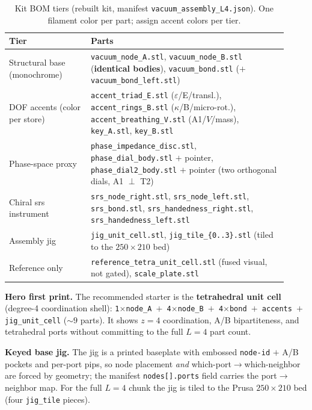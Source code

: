 \begin{table}[htbp]
\centering
\caption{Kit BOM tiers (rebuilt kit, manifest \texttt{vacuum\_assembly\_L4.json}). One filament color per part; assign accent colors per tier.}
\label{tab:vol9_exp_print_bom}
\begin{tabular}{p{0.27\linewidth} p{0.65\linewidth}}
\toprule
\textbf{Tier} & \textbf{Parts} \\
\midrule
Structural base (monochrome) & \texttt{vacuum\_node\_A.stl}, \texttt{vacuum\_node\_B.stl} (\textbf{identical bodies}), \texttt{vacuum\_bond.stl} ($+$ \texttt{vacuum\_bond\_left.stl}) \\
DOF accents (color per store) & \texttt{accent\_triad\_E.stl} ($\varepsilon$/E/transl.), \texttt{accent\_rings\_B.stl} ($\kappa$/B/micro-rot.), \texttt{accent\_breathing\_V.stl} (A1/$V$/mass), \texttt{key\_A.stl}, \texttt{key\_B.stl} \\
Phase-space proxy & \texttt{phase\_impedance\_disc.stl}, \texttt{phase\_dial\_body.stl} $+$ pointer, \texttt{phase\_dial2\_body.stl} $+$ pointer (two orthogonal dials, A1 $\perp$ T2) \\
Chiral srs instrument & \texttt{srs\_node\_right.stl}, \texttt{srs\_node\_left.stl}, \texttt{srs\_bond.stl}, \texttt{srs\_handedness\_right.stl}, \texttt{srs\_handedness\_left.stl} \\
Assembly jig & \texttt{jig\_unit\_cell.stl}, \texttt{jig\_tile\_\{0..3\}.stl} (tiled to the $250\times210$ bed) \\
Reference only & \texttt{reference\_tetra\_unit\_cell.stl} (fused visual, not gated), \texttt{scale\_plate.stl} \\
\bottomrule
\end{tabular}
\end{table}

\textbf{Hero first print.} The recommended starter is the \textbf{tetrahedral unit cell} (degree-4 coordination shell): \texttt{1$\times$node\_A $+$ 4$\times$node\_B $+$ 4$\times$bond $+$ accents $+$ jig\_unit\_cell} ($\sim\!9$ parts). It shows $z=4$ coordination, A/B bipartiteness, and tetrahedral ports without committing to the full $L=4$ part count.

\textbf{Keyed base jig.} The jig is a printed baseplate with embossed \texttt{node-id} $+$ A/B pockets and per-port pips, so node placement \emph{and} which-port$\to$which-neighbor are forced by geometry; the manifest \texttt{nodes[].ports} field carries the port$\to$neighbor map. For the full $L=4$ chunk the jig is tiled to the Prusa $250\times210$ bed (four \texttt{jig\_tile} pieces).

